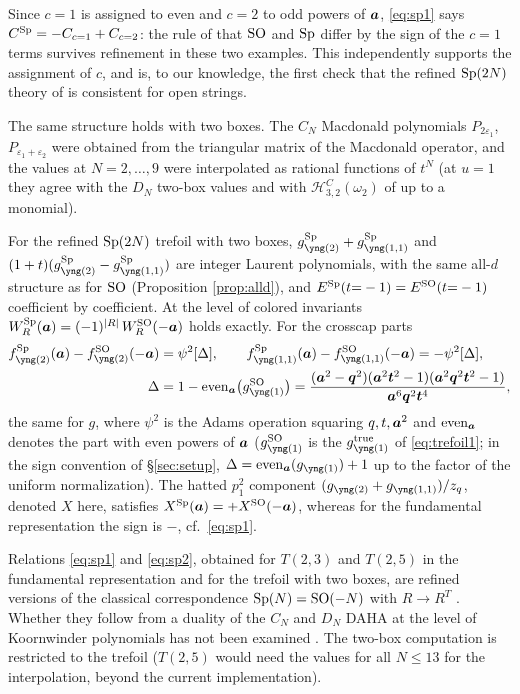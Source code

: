 Since $c = 1$ is assigned to even and $c = 2$ to odd powers of $\bm{a}$, \eqref{eq:sp1} says $C^{\mathrm{Sp}} = -C_{c=1} + C_{c=2}$: the rule of \cite{Marino09} that $\mathrm{SO}$ and $\mathrm{Sp}$ differ by the sign of the $c = 1$ terms survives refinement in these two examples. This independently supports the assignment of $c$, and is, to our knowledge, the first check that the refined $\mathrm{Sp}(2N)$ theory of \cite{AM22} is consistent for open strings.

The same structure holds with two boxes. The $C_N$ Macdonald polynomials $P_{2\varepsilon_1}$, $P_{\varepsilon_1+\varepsilon_2}$ were obtained from the triangular matrix of the Macdonald operator, and the values at $N = 2, \dots, 9$ were interpolated as rational functions of $t^N$ (at $u = 1$ they agree with the $D_N$ two-box values and with $\mathcal{H}^C_{3,2}(\omega_2)$ of \cite{Cherednik11} up to a monomial).
\begin{result}\label{cr:sp2}
For the refined $\mathrm{Sp}(2N)$ trefoil with two boxes, $g^{\Sp}_{\ytwo} + g^{\Sp}_{\yoneone}$ and $(1+t)(g^{\Sp}_{\ytwo} - g^{\Sp}_{\yoneone})$ are integer Laurent polynomials, with the same all-$d$ structure as for $\mathrm{SO}$ (Proposition \ref{prop:alld}), and $E^{\mathrm{Sp}}(t{=}-1) = E^{\mathrm{SO}}(t{=}-1)$ coefficient by coefficient. At the level of colored invariants $W_R^{\mathrm{Sp}}(\bm{a}) = (-1)^{|R|}\,W_R^{\mathrm{SO}}(-\bm{a})$ holds exactly. For the crosscap parts
\begin{equation}\label{eq:sp2}
\begin{aligned}
f^{\Sp}_{\ytwo}(\ba) - f^{\SO}_{\ytwo}(-\ba) &= \psi^2[\Delta], \qquad f^{\Sp}_{\yoneone}(\ba) - f^{\SO}_{\yoneone}(-\ba) = -\psi^2[\Delta], \\
\Delta &= 1 - \mathrm{even}_{\ba}\big(g^{\SO}_{\yone}\big) =\frac{(\ba^2 - \bq^2)(\ba^2\bt^2 - 1)(\ba^2\bq^2\bt^2 - 1)}{\ba^6\bq^2\bt^4},
\end{aligned}
\end{equation}
the same for $g$, where $\psi^2$ is the Adams operation squaring $q, t, \bm{a}^2$ and $\mathrm{even}_{\bm{a}}$ denotes the part with even powers of $\bm{a}$ ($g^{\SO}_{\yone}$ is the $g^{\mathrm{true}}_{\yone}$ of \eqref{eq:trefoil1}; in the sign convention of \S\ref{sec:setup}, $\Delta = \mathrm{even}_{\ba}(g_{\yone}) + 1$ up to the factor of the uniform normalization). The hatted $p_1^2$ component $(g_{\ytwo} + g_{\yoneone})/z_q$, denoted $X$ here, satisfies $X^{\mathrm{Sp}}(\bm{a}) = +X^{\mathrm{SO}}(-\bm{a})$, whereas for the fundamental representation the sign is $-$, cf.\ \eqref{eq:sp1}.
\end{result}
Relations \eqref{eq:sp1} and \eqref{eq:sp2}, obtained for $T(2,3)$ and $T(2,5)$ in the fundamental representation and for the trefoil with two boxes, are refined versions of the classical correspondence $\mathrm{Sp}(N) = \mathrm{SO}(-N)$ with $R \to R^T$ \cite{Cvitanovic08,MV10}. Whether they follow from a duality of the $C_N$ and $D_N$ DAHA at the level of Koornwinder polynomials has not been examined \open. The two-box computation is restricted to the trefoil ($T(2,5)$ would need the values for all $N \le 13$ for the interpolation, beyond the current implementation).
